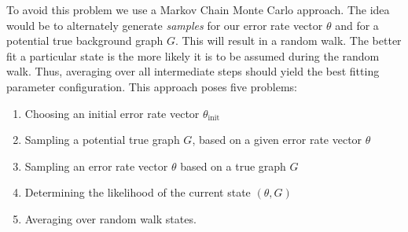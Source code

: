 \documentclass{scrartcl}
\newcommand{\p}{\text{p}}
\newcommand{\pardiff}[1]{\frac{\partial}{\partial #1}}
\begin{document}








To avoid this problem we use a Markov Chain Monte Carlo approach. The idea would be to alternately generate \textit{samples} for our error rate vector $\theta$ and for a potential true background graph $G$. This will result in a random walk. The better fit a particular state is the more likely it is to be assumed during the random walk. Thus, averaging over all intermediate steps should yield the best fitting parameter configuration. This approach poses five problems:
\begin{enumerate}
  \item Choosing an initial error rate vector $\theta_{\text{init}}$
  \item Sampling a potential true graph $G$, based on a given error rate vector $\theta$
  \item Sampling an error rate vector $\theta$ based on a true graph $G$
  \item Determining the likelihood of the current state $(\theta,G)$
  \item Averaging over random walk states.
\end{enumerate}
\end{document}
